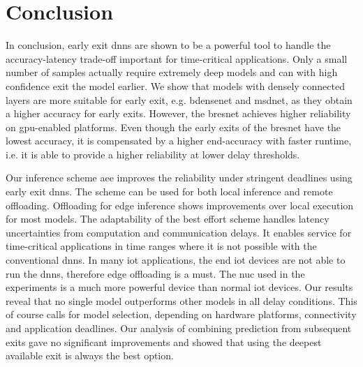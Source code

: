 \hypertarget{conclusion}{%
\chapter{Conclusion}\label{ch:conclusion}}


In conclusion, early exit \gls{dnn}s are shown to be a powerful tool to handle the accuracy-latency trade-off important for time-critical applications. Only a small number of samples actually require extremely deep models and can with high confidence exit the model earlier. We show that models with densely connected layers are more suitable for early exit, e.g. \gls{bdensenet} and \gls{msdnet}, as they obtain a higher accuracy for early exits. However, the \gls{bresnet} achieves higher reliability on \gls{gpu}-enabled platforms. Even though the early exits of the \gls{bresnet} have the lowest accuracy, it is compensated by a higher end-accuracy with faster runtime, i.e. it is able to provide a higher reliability at lower delay thresholds.

Our inference scheme \gls{aee} improves the reliability under stringent deadlines using early exit \gls{dnn}s. The scheme can be used for both local inference and remote offloading. Offloading for edge inference shows improvements over local execution for most models. The adaptability of the best effort scheme handles latency uncertainties from computation and communication delays. It enables service for time-critical applications in time ranges where it is not possible with the conventional \gls{dnn}s. In many \gls{iot} applications, the end \gls{iot} devices are not able to run the \gls{dnn}s, therefore edge offloading is a must. The \gls{nuc} used in the experiments is a much more powerful device than normal \gls{iot} devices. Our results reveal that no single model outperforms other models in all delay conditions. This of course calls for model selection, depending on hardware platforms, connectivity and application deadlines. Our analysis of combining prediction from subsequent exits gave no significant improvements and showed that using the deepest available exit is always the best option.


